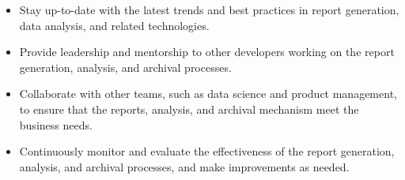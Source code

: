\documentclass[a4paper]{article}
\begin{document}
\begin{itemize}
\item Stay up-to-date with the latest trends and best practices in report generation, data analysis, and related technologies.
\item Provide leadership and mentorship to other developers working on the report generation, analysis, and archival processes.
\item Collaborate with other teams, such as data science and product management, to ensure that the reports, analysis, and archival mechanism meet the business needs.
\item Continuously monitor and evaluate the effectiveness of the report generation, analysis, and archival processes, and make improvements as needed.
\end{itemize}
\vspace*{2mm}
\end{document}
